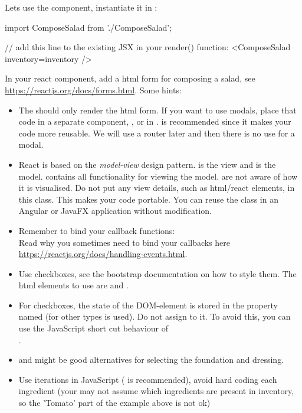 \documentclass[fleqn, article, a4paper]{memoir}
\begin{document}
\begin{Assignments}
\item Lets use the component, instantiate it in :
\begin{Code}
import ComposeSalad from './ComposeSalad';

// add this line to the existing JSX in your render() function:
<ComposeSalad inventory={inventory} />
\end{Code}

\item In your  react component, add a html form for composing a salad, see \url{https://reactjs.org/docs/forms.html}. Some hints:
\begin{itemize}
  \item The  should only render the html form. If you want to use modals, place that code in a separate component, , or in .  is recommended since it makes your code more reusable. We will use a router later and then there is no use for a modal.
  \item React is based on the \emph{model-view} design pattern.  is the view and  is the model.  contains all functionality for viewing the model.  are not aware of how it is visualised. Do not put any view details, such as html/react elements, in this class. This makes your code portable. You can reuse the  class in an Angular or JavaFX application without modification.
  \item Remember to bind your callback functions:\\  Read why you sometimes need to bind your callbacks here \url{https://reactjs.org/docs/handling-events.html}.
  \item Use checkboxes, see the bootstrap documentation on how to style them. The html elements to use are  and .
  \item For checkboxes, the state of the DOM-element is stored in the property named  (for other  types  is used). Do not assign  to it. To avoid this, you can use the JavaScript short cut behaviour of \code{||} \\ .
  \item {} and  might be good alternatives for selecting the foundation and dressing.
  \item Use iterations in JavaScript ( is recommended), avoid hard coding each ingredient (your may not assume which ingredients are present in inventory, so the 'Tomato' part of the example above is not ok)

\end{itemize}
\end{Assignments}
\end{document}
